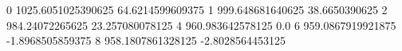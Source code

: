0 1025.6051025390625 64.6214599609375
1 999.648681640625 38.6650390625
2 984.24072265625 23.257080078125
4 960.983642578125 0.0
6 959.0867919921875 -1.8968505859375
8 958.1807861328125 -2.8028564453125
